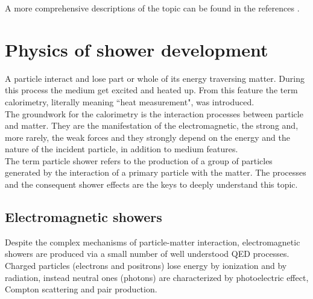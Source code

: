 A more comprehensive descriptions of the topic can be found in the references \cite{Wigmans_book, Wigmans_art_of_cal, Gianotti_article}.

\section{Physics of shower development}
A particle interact and lose part or whole of its energy traversing matter. During this process the medium get excited and heated up. From this feature the term calorimetry, literally meaning ``heat measurement", was introduced.\\
The groundwork for the calorimetry is the interaction processes between particle and matter. They are the manifestation of the electromagnetic, the strong and, more rarely, the weak forces and they strongly depend on the energy and the nature of the incident particle, in addition to medium features.\\
The term particle shower refers to the production of a group of particles generated by the interaction of a primary particle with the matter. The processes and the consequent shower effects are the keys to deeply understand this topic.\\

\subsection{Electromagnetic showers} \label{subsec:em_shower}
Despite the complex mechanisms of particle-matter interaction, electromagnetic showers are produced via a small number of well understood QED processes. Charged particles (electrons and positrons) lose energy by ionization and by radiation, instead neutral ones (photons) are characterized by photoelectric effect, Compton scattering and pair production.\\

